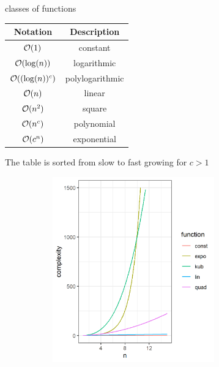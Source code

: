 \begin{vbframe}{classes of functions}

\begin{center}
  \begin{tabular}{ c | c}
  Notation & Description \\
  \hline
  $\mathcal{O}(1)$ & constant \\
  $\mathcal{O}(\log(n))$ & logarithmic \\
  $\mathcal{O}((\log(n))^c)$ & polylogarithmic \\
  $\mathcal{O}(n)$ & linear \\
  $\mathcal{O}(n^2)$ & square \\
  $\mathcal{O}(n^c)$ & polynomial \\
  $\mathcal{O}(c^n)$ & exponential
  \end{tabular}
\end{center}

The table is sorted from slow to fast growing for $c > 1$

\framebreak

\lz

\begin{center}
\begin{figure}
  \includegraphics[height = 8cm, width = 9cm]{figure_man/classes.png}
\end{figure}
\end{center}

\end{vbframe}



\endlecture

